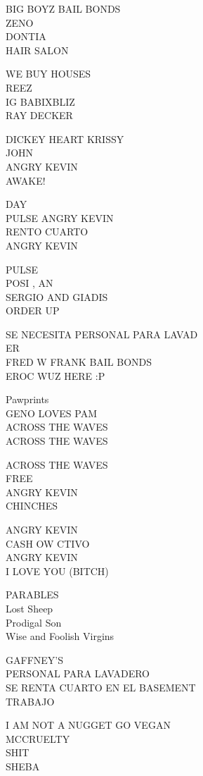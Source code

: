 \documentclass[10pt,letterpaper]{article}
\begin{document}
BIG BOYZ BAIL BONDS\\
ZENO\\
DONTIA\\
HAIR SALON

WE BUY HOUSES\\
REEZ\\
IG BABIXBLIZ\\
RAY DECKER

DICKEY HEART KRISSY\\
JOHN\\
ANGRY KEVIN\\
AWAKE!

DAY\\
PULSE ANGRY KEVIN\\
RENTO CUARTO\\
ANGRY KEVIN

PULSE\\
POSI , AN\\
SERGIO AND GIADIS\\
ORDER UP

SE NECESITA PERSONAL PARA LAVAD\\
ER\\
FRED W FRANK BAIL BONDS\\
EROC WUZ HERE :P

Pawprints\\
GENO LOVES PAM\\
ACROSS THE WAVES\\
ACROSS THE WAVES

ACROSS THE WAVES\\
FREE\\
ANGRY KEVIN\\
CHINCHES

ANGRY KEVIN\\
CASH OW CTIVO\\
ANGRY KEVIN\\
I LOVE YOU (BITCH)

PARABLES\\
Lost Sheep\\
Prodigal Son\\
Wise and Foolish Virgins

GAFFNEY'S\\
PERSONAL PARA LAVADERO\\
SE RENTA CUARTO EN EL BASEMENT\\
TRABAJO

I AM NOT A NUGGET GO VEGAN\\
MCCRUELTY\\
SHIT\\
SHEBA
\end{document}
